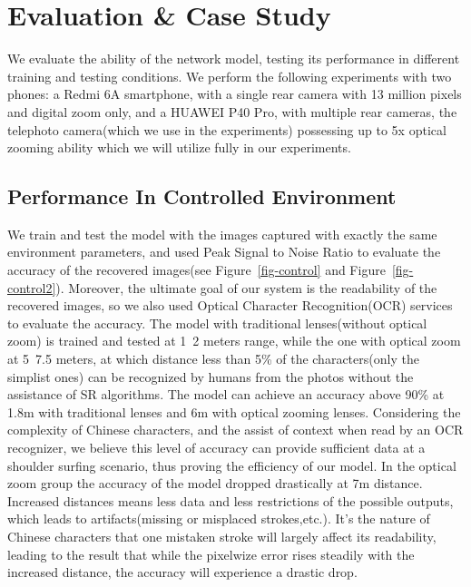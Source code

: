 \section{Evaluation \& Case Study}
\label{sec-evaluation}

We evaluate the ability of the network model, testing its performance in different training and testing conditions. We perform the following experiments with two phones: a Redmi 6A smartphone, with a single rear camera with 13 million pixels and digital zoom only, and a HUAWEI P40 Pro, with multiple rear cameras, the telephoto camera(which we use in the experiments) possessing up to 5x optical zooming ability which we will utilize fully in our experiments. 
\subsection{Performance In Controlled Environment}
We train and test the model with the images captured with exactly the same environment parameters, and used Peak Signal to Noise Ratio to evaluate the accuracy of the recovered images(see Figure~\ref{fig-control} and Figure~\ref{fig-control2}). Moreover, the ultimate goal of our system is the readability of the recovered images, so we also used Optical Character Recognition(OCR) services to evaluate the accuracy. The model with traditional lenses(without optical zoom) is trained and tested at 1~2 meters range, while the one with optical zoom at 5~7.5 meters, at which distance less than 5\% of the characters(only the simplist ones) can be recognized by humans from the photos without the assistance of SR algorithms. The model can achieve an accuracy above 90\% at 1.8m with traditional lenses and 6m with optical zooming lenses. Considering the complexity of Chinese characters, and the assist of context when read by an OCR recognizer, we believe this level of accuracy can provide sufficient data at a shoulder surfing scenario, thus proving the efficiency of our model.
In the optical zoom group the accuracy of the model dropped drastically at 7m distance. Increased distances means less data and less restrictions of the possible outputs, which leads to artifacts(missing or misplaced strokes,etc.). It's the nature of Chinese characters that one mistaken stroke will largely affect its readability, leading to the result that while the pixelwize error rises steadily with the increased distance, the accuracy will experience a drastic drop.

